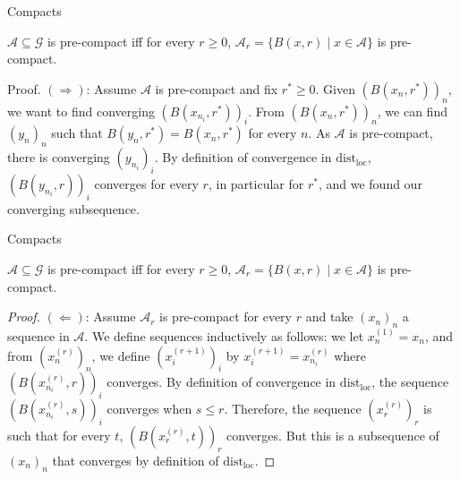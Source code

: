 \documentclass{beamer}
\newcommand{\dloc}{\mathrm{dist}_\mathrm{loc}}
\newcommand{\Gcal}{\mathcal{G}}
\newcommand{\Acal}{\mathcal{A}}
\begin{document}
\begin{frame}{Compacts}

  \begin{theorem}
    $\Acal \subseteq \Gcal$ is pre-compact iff for every $r \ge 0$, $\Acal_r = \{B(x, r)
      \mid x \in \Acal\}$ is pre-compact.
  \end{theorem}

  \pause

  \begin{block}{Proof.}
    $(\Rightarrow)$: Assume $\Acal$ is pre-compact and fix $r^* \ge 0$.
    \pause
    Given $(B(x_n, r^*))_n$, we want to find converging $(B(x_{n_i}, r^*))_i$.
    \pause
    From $(B(x_n, r^*))_n$, we can find $(y_n)_n$ such that $B(y_n, r^*) = B(x_n, r^*)$
    for every $n$.
    \pause
    As $\Acal$ is pre-compact, there is converging $(y_{n_i})_i$.
    \pause
    By definition of convergence in $\dloc$, $(B(y_{n_i}, r))_i$ converges for every $r$,
    in particular for $r^*$, and we found our converging subsequence.
  \end{block}
\end{frame}

\begin{frame}{Compacts}

  \begin{theorem}
    $\Acal \subseteq \Gcal$ is pre-compact iff for every $r \ge 0$, $\Acal_r = \{B(x, r)
      \mid x \in \Acal\}$ is pre-compact.
  \end{theorem}

  \begin{proof}
    $(\Leftarrow)$: Assume $\Acal_r$ is pre-compact for every $r$ and take $(x_n)_n$ a
    sequence in $\Acal$.
    \pause
    We define sequences inductively as follows: we let $x_n^{(1)} = x_n$,
    \pause
    and from $(x_n^{(r)})_n$, we define $(x_i^{(r + 1)})_i$ by $x_i^{(r + 1)} =
      x_{n_i}^{(r)}$ where $(B(x_{n_i}^{(r)}, r))_i$ converges.
    \pause
    By definition of convergence in $\dloc$, the sequence $(B(x_{n_i}^{(r)}, s))_i$
    converges when $s \le r$.
    \pause
    Therefore, the sequence $(x_r^{(r)})_r$ is such that for every $t$, $(B(x_r^{(r)},
      t))_r$ converges.
    \pause
    But this is a subsequence of $(x_n)_n$ that converges by definition of $\dloc$.
  \end{proof}
\end{frame}
\end{document}
